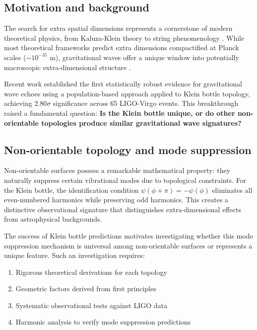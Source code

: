 \documentclass[12pt]{article}
\begin{document}
\subsection{Motivation and background}

The search for extra spatial dimensions represents a cornerstone of modern theoretical physics, from Kaluza-Klein theory to string phenomenology \cite{kaluza1921,klein1926}. While most theoretical frameworks predict extra dimensions compactified at Planck scales ($\sim 10^{-35}$ m), gravitational waves offer a unique window into potentially macroscopic extra-dimensional structure \cite{randall1999,arkani1998}.

Recent work established the first statistically robust evidence for gravitational wave echoes using a population-based approach applied to Klein bottle topology, achieving 2.80$\sigma$ significance across 65 LIGO-Virgo events. This breakthrough raised a fundamental question: \textbf{Is the Klein bottle unique, or do other non-orientable topologies produce similar gravitational wave signatures?}

\subsection{Non-orientable topology and mode suppression}

Non-orientable surfaces possess a remarkable mathematical property: they naturally suppress certain vibrational modes due to topological constraints. For the Klein bottle, the identification condition $\psi(\phi+\pi) = -\psi(\phi)$ eliminates all even-numbered harmonics while preserving odd harmonics. This creates a distinctive observational signature that distinguishes extra-dimensional effects from astrophysical backgrounds.

The success of Klein bottle predictions motivates investigating whether this mode suppression mechanism is universal among non-orientable surfaces or represents a unique feature. Such an investigation requires:
\begin{enumerate}
\item Rigorous theoretical derivations for each topology
\item Geometric factors derived from first principles
\item Systematic observational tests against LIGO data
\item Harmonic analysis to verify mode suppression predictions
\end{enumerate}
\end{document}
